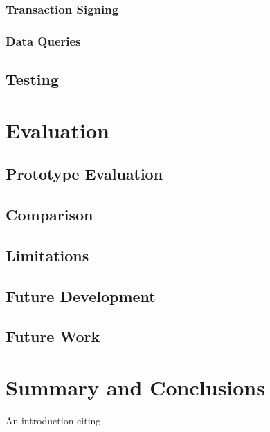 \documentclass[a4paper]{article}
\begin{document}
\subsubsection{Transaction Signing}
\subsubsection{Data Queries}

\subsection{Testing}
\newpage

\section{Evaluation}
\subsection{Prototype Evaluation}
\subsection{Comparison}
\subsection{Limitations}
\subsection{Future Development}
\subsection{Future Work}
\newpage

\section{Summary and Conclusions}
An introduction citing \cite{someauthor}

\newpage



\end{document}

